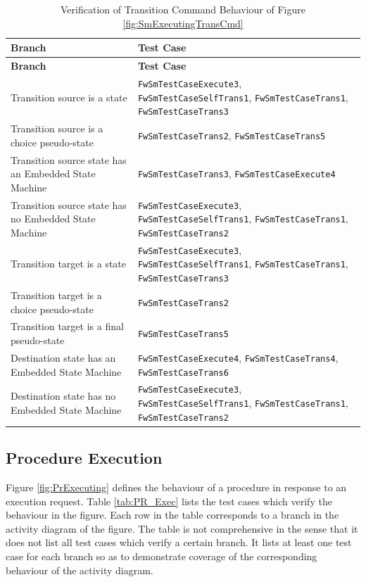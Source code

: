 \documentclass[a4paper,10pt]{article}
\begin{document}
\begin{longtable}{|p{6.7cm}|p{4.5cm}|}
\caption{Verification of Transition Command Behaviour of Figure \ref{fig:SmExecutingTransCmd}}
\label{tab:SM_Trans_Exec} \\
\hline
\rowcolor{gray}
\textbf{Branch} & \textbf{Test Case} \\
\hline
\endfirsthead
\rowcolor{gray}
\textbf{Branch} & \textbf{Test Case} \\
\hline
\endhead
Transition source is a state & \texttt{FwSmTestCaseExecute3}, \texttt{FwSmTestCaseSelfTrans1}, \texttt{FwSmTestCaseTrans1}, \texttt{FwSmTestCaseTrans3} \\
\hline
Transition source is a choice pseudo-state & \texttt{FwSmTestCaseTrans2}, \texttt{FwSmTestCaseTrans5} \\
\hline
Transition source state has an Embedded State Machine & \texttt{FwSmTestCaseTrans3}, \texttt{FwSmTestCaseExecute4} \\
\hline
Transition source state has no Embedded State Machine & \texttt{FwSmTestCaseExecute3}, \texttt{FwSmTestCaseSelfTrans1}, \texttt{FwSmTestCaseTrans1}, 
\texttt{FwSmTestCaseTrans2} \\
\hline
Transition target is a state & \texttt{FwSmTestCaseExecute3}, \texttt{FwSmTestCaseSelfTrans1}, \texttt{FwSmTestCaseTrans1}, \texttt{FwSmTestCaseTrans3} \\
\hline
Transition target is a choice pseudo-state & \texttt{FwSmTestCaseTrans2} \\
\hline
Transition target is a final pseudo-state & \texttt{FwSmTestCaseTrans5} \\
\hline
Destination state has an Embedded State Machine & \texttt{FwSmTestCaseExecute4}, \texttt{FwSmTestCaseTrans4}, \texttt{FwSmTestCaseTrans6} \\
\hline
Destination state has no Embedded State Machine & \texttt{FwSmTestCaseExecute3}, \texttt{FwSmTestCaseSelfTrans1}, \texttt{FwSmTestCaseTrans1}, 
\texttt{FwSmTestCaseTrans2} \\
\hline
\end{longtable}

\subsection{Procedure Execution}\label{Appendix_D_PR_Exec}
Figure \ref{fig:PrExecuting} defines the behaviour of a procedure in response to an 
execution request. 
Table \ref{tab:PR_Exec} lists the test cases which verify the behaviour in the figure. 
Each row in the table corresponds to a branch in the activity diagram of the figure. 
The table is not comprehensive in the sense that it does not list all test cases which 
verify a certain branch. 
It lists at least one test case for each branch so as to demonstrate coverage of 
the corresponding behaviour of the activity diagram.
\end{document}
